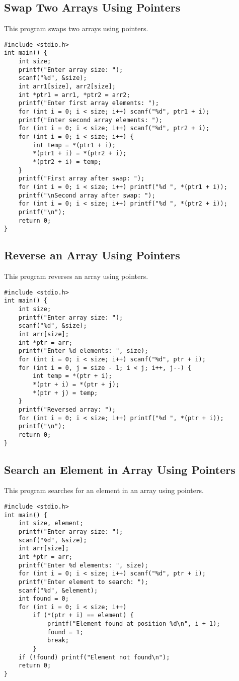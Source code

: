 \documentclass[a4paper,12pt]{article}
\begin{document}
\subsection{Swap Two Arrays Using Pointers}
This program swaps two arrays using pointers.
\begin{lstlisting}[caption={Swap Two Arrays Using Pointers}]
#include <stdio.h>
int main() {
    int size;
    printf("Enter array size: ");
    scanf("%d", &size);
    int arr1[size], arr2[size];
    int *ptr1 = arr1, *ptr2 = arr2;
    printf("Enter first array elements: ");
    for (int i = 0; i < size; i++) scanf("%d", ptr1 + i);
    printf("Enter second array elements: ");
    for (int i = 0; i < size; i++) scanf("%d", ptr2 + i);
    for (int i = 0; i < size; i++) {
        int temp = *(ptr1 + i);
        *(ptr1 + i) = *(ptr2 + i);
        *(ptr2 + i) = temp;
    }
    printf("First array after swap: ");
    for (int i = 0; i < size; i++) printf("%d ", *(ptr1 + i));
    printf("\nSecond array after swap: ");
    for (int i = 0; i < size; i++) printf("%d ", *(ptr2 + i));
    printf("\n");
    return 0;
}
\end{lstlisting}
\clearpage

\subsection{Reverse an Array Using Pointers}
This program reverses an array using pointers.
\begin{lstlisting}[caption={Reverse an Array Using Pointers}]
#include <stdio.h>
int main() {
    int size;
    printf("Enter array size: ");
    scanf("%d", &size);
    int arr[size];
    int *ptr = arr;
    printf("Enter %d elements: ", size);
    for (int i = 0; i < size; i++) scanf("%d", ptr + i);
    for (int i = 0, j = size - 1; i < j; i++, j--) {
        int temp = *(ptr + i);
        *(ptr + i) = *(ptr + j);
        *(ptr + j) = temp;
    }
    printf("Reversed array: ");
    for (int i = 0; i < size; i++) printf("%d ", *(ptr + i));
    printf("\n");
    return 0;
}
\end{lstlisting}
\clearpage

\subsection{Search an Element in Array Using Pointers}
This program searches for an element in an array using pointers.
\begin{lstlisting}[caption={Search an Element in Array Using Pointers}]
#include <stdio.h>
int main() {
    int size, element;
    printf("Enter array size: ");
    scanf("%d", &size);
    int arr[size];
    int *ptr = arr;
    printf("Enter %d elements: ", size);
    for (int i = 0; i < size; i++) scanf("%d", ptr + i);
    printf("Enter element to search: ");
    scanf("%d", &element);
    int found = 0;
    for (int i = 0; i < size; i++)
        if (*(ptr + i) == element) {
            printf("Element found at position %d\n", i + 1);
            found = 1;
            break;
        }
    if (!found) printf("Element not found\n");
    return 0;
}
\end{lstlisting}
\clearpage
\end{document}
